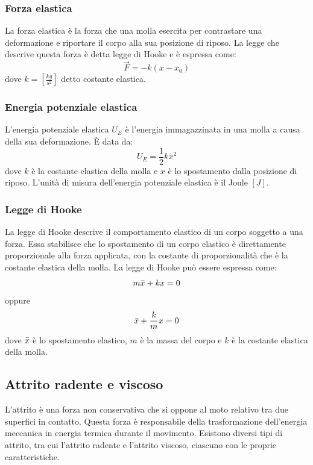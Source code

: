 \documentclass{article}
\begin{document}
\subsubsection{Forza elastica}
La forza elastica è la forza che una molla esercita per contrastare una deformazione e riportare il corpo alla sua posizione di riposo. La legge che descrive questa forza è detta legge di Hooke e è espressa come:
\[
    \Vec{F} = -k(x-x_0) 
\]
dove \(k = [\frac{kg}{s^2}]\) detto costante elastica.
\subsubsection{Energia potenziale elastica}
L'energia potenziale elastica \( U_E \) è l'energia immagazzinata in una molla a causa della sua deformazione. È data da:
\[ U_E = \frac{1}{2}kx^2 \]
dove \( k \) è la costante elastica della molla e \( x \) è lo spostamento dalla posizione di riposo. L'unità di misura dell'energia potenziale elastica è il Joule \([J]\).

\subsubsection{Legge di Hooke}
La legge di Hooke descrive il comportamento elastico di un corpo soggetto a una forza. Essa stabilisce che lo spostamento di un corpo elastico è direttamente proporzionale alla forza applicata, con la costante di proporzionalità che è la costante elastica della molla. La legge di Hooke può essere espressa come:
\[ m\Bar{x} + kx = 0 \]
oppure
\[ \Bar{x} + \frac{k}{m}x = 0 \]
dove \( \Bar{x} \) è lo spostamento elastico, \( m \) è la massa del corpo e \( k \) è la costante elastica della molla.



\subsection{Attrito radente e viscoso}
L'attrito è una forza non conservativa che si oppone al moto relativo tra due superfici in contatto. Questa forza è responsabile della trasformazione dell'energia meccanica in energia termica durante il movimento. Esistono diversi tipi di attrito, tra cui l'attrito radente e l'attrito viscoso, ciascuno con le proprie caratteristiche.
\end{document}
